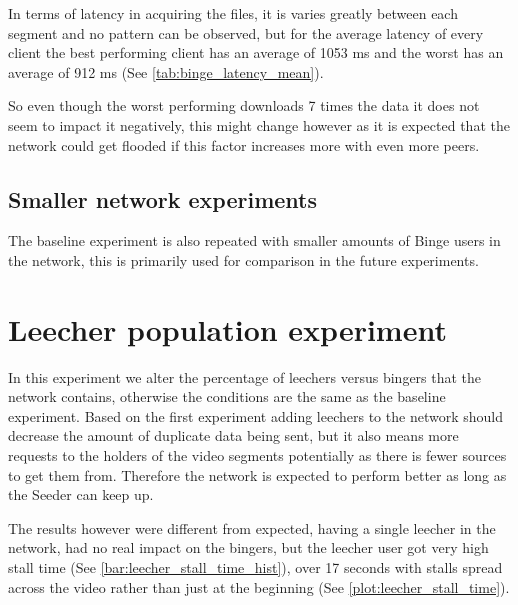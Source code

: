 

In terms of latency in acquiring the files, it is varies greatly between each segment and no pattern can be observed, but for the average latency of every client the best performing client has an average of 1053 \acs{ms} and the worst has an average of 912 \acs{ms} (See \autoref{tab:binge_latency_mean}).



So even though the worst performing downloads 7 times the data it does not seem to impact it negatively, this might change however as it is expected that the network could get flooded if this factor increases more with even more peers.

\subsection{Smaller network experiments}
The baseline experiment is also repeated with smaller amounts of Binge users in the network, this is primarily used for comparison in the future experiments.

\section{Leecher population experiment}
In this experiment we alter the percentage of leechers versus bingers that the network contains, otherwise the conditions are the same as the baseline experiment.
Based on the first experiment adding leechers to the network should decrease the amount of duplicate data being sent, but it also means more requests to the holders of the video segments potentially as there is fewer sources to get them from. Therefore the network is expected to perform better as long as the Seeder can keep up.

The results however were different from expected, having a single leecher in the network, had no real impact on the bingers, but the leecher user got very high stall time (See \autoref{bar:leecher_stall_time_hist}), over 17 seconds with stalls spread across the video rather than just at the beginning (See \autoref{plot:leecher_stall_time}). 






